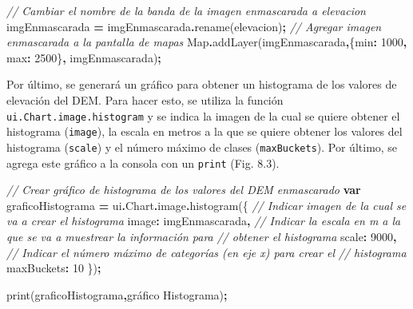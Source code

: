 \documentclass[
  12pt,
  letterpaper,
  twoside]{book}
\newenvironment{Shaded}{\begin{snugshade}}{\end{snugshade}}
\newcommand{\AttributeTok}[1]{\textcolor[rgb]{0.77,0.63,0.00}{#1}}
\newcommand{\BuiltInTok}[1]{#1}
\newcommand{\CommentTok}[1]{\textcolor[rgb]{0.56,0.35,0.01}{\textit{#1}}}
\newcommand{\DataTypeTok}[1]{\textcolor[rgb]{0.13,0.29,0.53}{#1}}
\newcommand{\DecValTok}[1]{\textcolor[rgb]{0.00,0.00,0.81}{#1}}
\newcommand{\FunctionTok}[1]{\textcolor[rgb]{0.00,0.00,0.00}{#1}}
\newcommand{\KeywordTok}[1]{\textcolor[rgb]{0.13,0.29,0.53}{\textbf{#1}}}
\newcommand{\NormalTok}[1]{#1}
\newcommand{\OperatorTok}[1]{\textcolor[rgb]{0.81,0.36,0.00}{\textbf{#1}}}
\newcommand{\StringTok}[1]{\textcolor[rgb]{0.31,0.60,0.02}{#1}}
\begin{document}
\begin{Shaded}
\begin{Highlighting}[]
\CommentTok{// Cambiar el nombre de la banda de la imagen enmascarada a elevacion}
\NormalTok{imgEnmascarada }\OperatorTok{=}\NormalTok{ imgEnmascarada}\OperatorTok{.}\FunctionTok{rename}\NormalTok{(}\StringTok{\textquotesingle{}elevacion\textquotesingle{}}\NormalTok{)}\OperatorTok{;}
\CommentTok{// Agregar imagen enmascarada a la pantalla de mapas}
\BuiltInTok{Map}\OperatorTok{.}\FunctionTok{addLayer}\NormalTok{(imgEnmascarada}\OperatorTok{,}\NormalTok{\{}\DataTypeTok{min}\OperatorTok{:} \DecValTok{1000}\OperatorTok{,} \DataTypeTok{max}\OperatorTok{:} \DecValTok{2500}\NormalTok{\}}\OperatorTok{,} \StringTok{\textquotesingle{}imgEnmascarada\textquotesingle{}}\NormalTok{)}\OperatorTok{;}
\end{Highlighting}
\end{Shaded}

Por último, se generará un gráfico para obtener un histograma de los valores de elevación del DEM. Para hacer esto, se utiliza la función \texttt{ui.Chart.image.histogram} y se indica la imagen de la cual se quiere obtener el histograma (\texttt{image}), la escala en metros a la que se quiere obtener los valores del histograma (\texttt{scale}) y el número máximo de clases (\texttt{maxBuckets}). Por último, se agrega este gráfico a la consola con un \texttt{print} (Fig. 8.3).

\begin{Shaded}
\begin{Highlighting}[]
\CommentTok{// Crear gráfico de histograma de los valores del DEM enmascarado}
\KeywordTok{var}\NormalTok{ graficoHistograma }\OperatorTok{=}\NormalTok{ ui}\OperatorTok{.}\AttributeTok{Chart}\OperatorTok{.}\AttributeTok{image}\OperatorTok{.}\FunctionTok{histogram}\NormalTok{(\{}
     \CommentTok{// Indicar imagen de la cual se va a crear el histograma  }
  \DataTypeTok{image}\OperatorTok{:}\NormalTok{ imgEnmascarada}\OperatorTok{,}
  \CommentTok{// Indicar la escala en m a la que se va a muestrear la información para  }
  \CommentTok{// obtener el histograma}
  \DataTypeTok{scale}\OperatorTok{:} \DecValTok{9000}\OperatorTok{,}
  \CommentTok{// Indicar el número máximo de categorías (en eje x) para crear el }
  \CommentTok{// histograma}
  \DataTypeTok{maxBuckets}\OperatorTok{:} \DecValTok{10}
\NormalTok{  \})}\OperatorTok{;}

\FunctionTok{print}\NormalTok{(graficoHistograma}\OperatorTok{,}\StringTok{\textquotesingle{}gráfico Histograma\textquotesingle{}}\NormalTok{)}\OperatorTok{;}
\end{Highlighting}
\end{Shaded}
\end{document}

